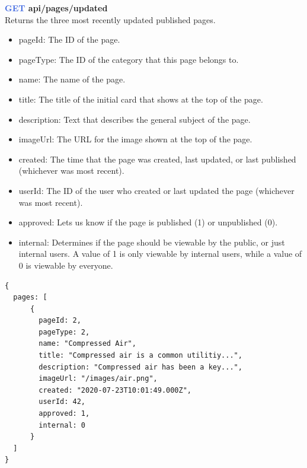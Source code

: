 \documentclass[onecolumn, draftclsnofoot,10pt, compsoc, usenames, dvipsnames]{IEEEtran}
\begin{document}
\noindent
\textbf{\textcolor{RoyalBlue}{GET} api/pages/updated} \\
Returns the three most recently updated published pages.
\begin{itemize}
    \item pageId: The ID of the page.
    \item pageType: The ID of the category that this page belongs to.
    \item name: The name of the page.
    \item title: The title of the initial card that shows at the top of the page.
    \item description: Text that describes the general subject of the page.
    \item imageUrl: The URL for the image shown at the top of the page.
    \item created: The time that the page was created, last updated, or last published (whichever was most recent).
    \item userId: The ID of the user who created or last updated the page (whichever was most recent).
    \item approved: Lets us know if the page is published (1) or unpublished (0).
    \item internal: Determines if the page should be viewable by the public, or just internal users. A value of 1 is only viewable by internal users, while a value of 0 is viewable by everyone.
\end{itemize}
\begin{lstlisting}[caption=Example Response]
{ 
  pages: [ 
      {
        pageId: 2,
        pageType: 2,
        name: "Compressed Air",
        title: "Compressed air is a common utilitiy...",
        description: "Compressed air has been a key...",
        imageUrl: "/images/air.png",
        created: "2020-07-23T10:01:49.000Z",
        userId: 42,
        approved: 1,
        internal: 0
      }
  ]
}
\end{lstlisting}
\\~\\
\end{document}
